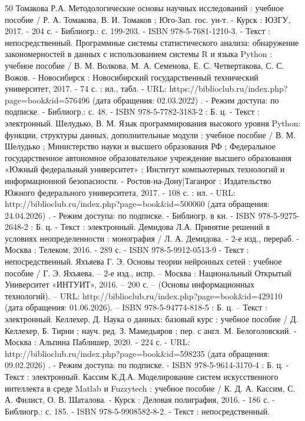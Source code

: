 \begin{thebibliography}{50}
 Томакова Р.А.  Методологические основы научных исследований : учебное пособие / Р. А. Томакова, В. И. Томаков ; Юго-Зап. гос. ун-т. - Курск : ЮЗГУ, 2017. - 204 с. - Библиогр.: с. 199-203. - ISBN 978-5-7681-1210-3. - Текст : непосредственный.
 Программные системы статистического анализа: обнаружение закономерностей в данных с использованием системы R и языка Python : учебное пособие / В. М. Волкова, М. А. Семенова, Е. С. Четвертакова, С. С. Вожов. - Новосибирск : Новосибирский государственный технический университет, 2017. - 74 с. : ил., табл. - URL: https://biblioclub.ru/index.php?page=book\&id=576496 (дата обращения: 02.03.2022) . - Режим доступа: по подписке. - Библиогр.: с. 48. - ISBN 978-5-7782-3183-2 : Б. ц. - Текст : электронный.
 Шелудько, В. М.  Язык программирования высокого уровня Python: функции, структуры данных, дополнительные модули : учебное пособие / В. М. Шелудько ; Министерство науки и высшего образования РФ ; Федеральное государственное автономное образовательное учреждение высшего образования «Южный федеральный университет» ; Институт компьютерных технологий и информационной безопасности. - Ростов-на-Дону|Таганрог : Издательство Южного федерального университета, 2017. - 108 с. : ил. - URL: http://biblioclub.ru/index.php?page=book\&id=500060 (дата обращения: 24.04.2026) . - Режим доступа: по подписке. - Библиогр. в кн. - ISBN 978-5-9275-2648-2 : Б. ц. - Текст : электронный.
 Демидова Л.А.  Принятие решений в условиях неопределенности : монография / Л. А. Демидова. - 2-е изд., перераб. - Москва : Телеком, 2016. - 289 с. - ISBN 978-5-9912-0513-9 - Текст : непосредственный.
 Яхъяева Г. Э. Основы теории нейронных сетей : учебное пособие / Г. Э. Яхъяева. – 2-е изд., испр. – Москва : Национальный Открытый Университет «ИНТУИТ», 2016. – 200 с. – (Основы информационных технологий). – URL: http://biblioclub.ru/index.php?page=book\&id=429110 (дата обращения: 01.06.2026). – ISBN 978-5-94774-818-5 : Б. ц. – Текст : электронный.
 Келлехер, Д.    Наука о данных: базовый курс : учебное пособие / Д. Келлехер, Б. Тирни ; науч. ред. З. Мамедьяров ; пер. с англ. М. Белоголовский. - Москва : Альпина Паблишер, 2020. - 224 с. - URL: http://biblioclub.ru/index.php?page=book\&id=598235 (дата обращения: 09.02.2026) . - Режим доступа: по подписке. - ISBN 978-5-9614-3170-4 : Б. ц. - Текст : электронный.
 Кассим К.Д.А.   Моделирование систем искусственного интеллекта в среде Matlab и Fuzzytech : учебное пособие / К. Д. А. Кассим, С. А. Филист, О. В. Шаталова. - Курск : Деловая полиграфия, 2016. - 186 с. - Библиогр.: с. 185. - ISBN 978-5-9908582-8-2. - Текст : непосредственный.

\end{thebibliography}
